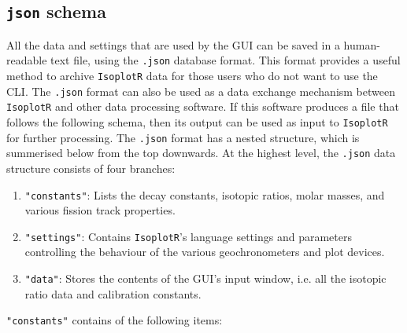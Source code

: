 \begin{refsection}

\chapter{\texttt{json} schema}\label{ch:schema}

All the data and settings that are used by the GUI can be saved in a
human-readable text file, using the \texttt{.json} database format.
This format provides a useful method to archive \texttt{IsoplotR} data
for those users who do not want to use the CLI. The \texttt{.json}
format can also be used as a data exchange mechanism between
\texttt{IsoplotR} and other data processing software. If this software
produces a file that follows the following schema, then its output can
be used as input to \texttt{IsoplotR} for further processing.  The
\texttt{.json} format has a nested structure, which is summerised
below from the top downwards. At the highest level, the \texttt{.json}
data structure consists of four branches:

\begin{enumerate}
\item{\tt "constants"}: Lists the decay constants, isotopic ratios,
  molar masses, and various fission track properties.
\item{\tt "settings"}: Contains \texttt{IsoplotR}'s language
  settings and parameters controlling the behaviour of the various
  geochronometers and plot devices.
\item{\tt "data"}: Stores the contents of the GUI's input window,
  i.e. all the isotopic ratio data and calibration constants.
\end{enumerate}

\noindent\texttt{"constants"} contains of the following items:


\end{refsection}
